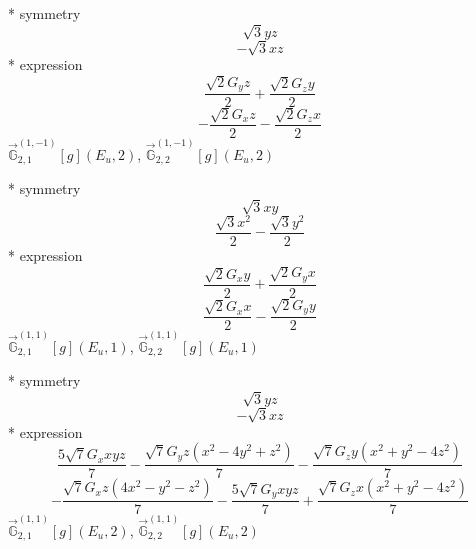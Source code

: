 \documentclass[fleqn,8pt]{jsarticle}
\begin{document}
\noindent\quad ** symmetry
\begin{dmath*}
\sqrt{3} y z
\end{dmath*}
\begin{dmath*}
- \sqrt{3} x z
\end{dmath*}
\noindent\quad ** expression
\begin{dmath*}
\frac{\sqrt{2} G_{y} z}{2} + \frac{\sqrt{2} G_{z} y}{2}
\end{dmath*}
\begin{dmath*}
- \frac{\sqrt{2} G_{x} z}{2} - \frac{\sqrt{2} G_{z} x}{2}
\end{dmath*}
\noindent\quad $\vec{\mathbb{G}}_{2,1}^{(1,-1)}[g](E_{u},2)$, $\vec{\mathbb{G}}_{2,2}^{(1,-1)}[g](E_{u},2)$

\noindent\quad ** symmetry
\begin{dmath*}
\sqrt{3} x y
\end{dmath*}
\begin{dmath*}
\frac{\sqrt{3} x^{2}}{2} - \frac{\sqrt{3} y^{2}}{2}
\end{dmath*}
\noindent\quad ** expression
\begin{dmath*}
\frac{\sqrt{2} G_{x} y}{2} + \frac{\sqrt{2} G_{y} x}{2}
\end{dmath*}
\begin{dmath*}
\frac{\sqrt{2} G_{x} x}{2} - \frac{\sqrt{2} G_{y} y}{2}
\end{dmath*}
\noindent\quad $\vec{\mathbb{G}}_{2,1}^{(1,1)}[g](E_{u},1)$, $\vec{\mathbb{G}}_{2,2}^{(1,1)}[g](E_{u},1)$

\noindent\quad ** symmetry
\begin{dmath*}
\sqrt{3} y z
\end{dmath*}
\begin{dmath*}
- \sqrt{3} x z
\end{dmath*}
\noindent\quad ** expression
\begin{dmath*}
\frac{5 \sqrt{7} G_{x} x y z}{7} - \frac{\sqrt{7} G_{y} z \left(x^{2} - 4 y^{2} + z^{2}\right)}{7} - \frac{\sqrt{7} G_{z} y \left(x^{2} + y^{2} - 4 z^{2}\right)}{7}
\end{dmath*}
\begin{dmath*}
- \frac{\sqrt{7} G_{x} z \left(4 x^{2} - y^{2} - z^{2}\right)}{7} - \frac{5 \sqrt{7} G_{y} x y z}{7} + \frac{\sqrt{7} G_{z} x \left(x^{2} + y^{2} - 4 z^{2}\right)}{7}
\end{dmath*}
\noindent\quad $\vec{\mathbb{G}}_{2,1}^{(1,1)}[g](E_{u},2)$, $\vec{\mathbb{G}}_{2,2}^{(1,1)}[g](E_{u},2)$
\end{document}
